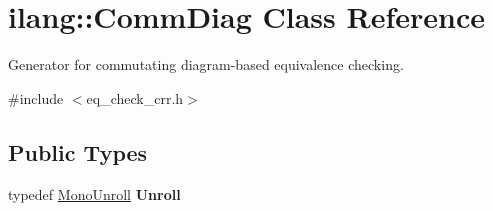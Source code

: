 \hypertarget{classilang_1_1_comm_diag}{}\section{ilang\+:\+:Comm\+Diag Class Reference}
\label{classilang_1_1_comm_diag}


Generator for commutating diagram-\/based equivalence checking.  




{\ttfamily \#include $<$eq\+\_\+check\+\_\+crr.\+h$>$}

\subsection*{Public Types}
\begin{DoxyCompactItemize}
\item 
\mbox{\label{classilang_1_1_comm_diag_ab4d9eed440ed1bb117544d1891b8750d}} 
typedef \mbox{\hyperlink{classilang_1_1_mono_unroll}{Mono\+Unroll}} {\bfseries Unroll}
\end{DoxyCompactItemize}
